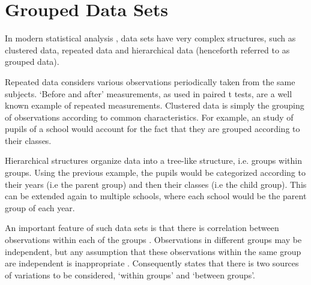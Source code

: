 \section{Grouped Data Sets}
In modern statistical analysis , data sets have very complex
structures, such as  clustered data, repeated data and
hierarchical data (henceforth referred to as grouped data).

Repeated data considers various observations periodically taken
from the same subjects. `Before and after' measurements, as used
in paired t tests, are a well known example of repeated
measurements. Clustered data is simply the grouping of
observations according to common characteristics. For example, an
study of pupils of a school would account for the fact that they
are grouped according to their classes.

Hierarchical structures organize data into a tree-like structure,
i.e. groups within groups. Using the previous example, the pupils
would be categorized according to their years (i.e the parent
group) and then their classes (i.e the child group). This can be
extended again to multiple schools, where each school would be the
parent group of each year.

An important feature of such data sets is that there is
correlation between observations within each of the groups
\citep{Faraway}. Observations in different groups may be
independent, but any assumption that these observations within the
same group are independent is inappropriate . Consequently
\citet{Demi} states that there is two sources of variations to be
considered, `within groups' and `between groups'.

